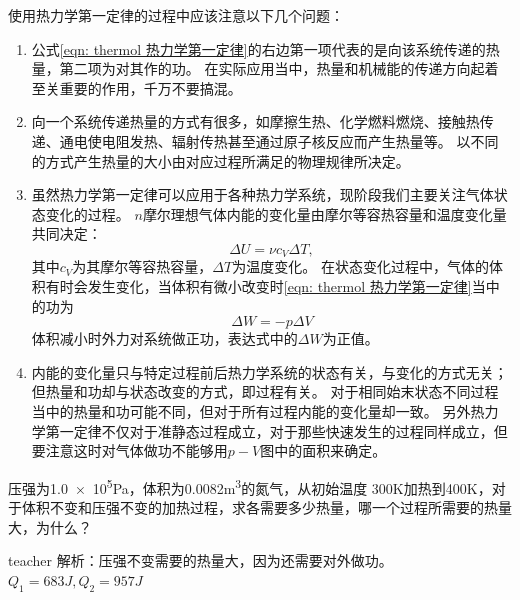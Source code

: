使用热力学第一定律的过程中应该注意以下几个问题：
\begin{enumerate}
\item 公式\ref{eqn: thermol 热力学第一定律}的右边第一项代表的是向该系统传递的热量，第二项为对其作的功。
在实际应用当中，热量和机械能的传递方向起着至关重要的作用，千万不要搞混。
\item 向一个系统传递热量的方式有很多，如摩擦生热、化学燃料燃烧、接触热传递、通电使电阻发热、辐射传热甚至通过原子核反应而产生热量等。
以不同的方式产生热量的大小由对应过程所满足的物理规律所决定。
\item 虽然热力学第一定律可以应用于各种热力学系统，现阶段我们主要关注气体状态变化的过程。
$n$摩尔理想气体内能的变化量由摩尔等容热容量和温度变化量共同决定：
\begin{equation}
\Delta U = \nu c_V\Delta T,
\end{equation}
其中$c_V$为其摩尔等容热容量，$\Delta T$为温度变化。
在状态变化过程中，气体的体积有时会发生变化，当体积有微小改变时\ref{eqn: thermol 热力学第一定律}当中的功为
\begin{equation}
\Delta W = -p\Delta V
\end{equation}
体积减小时外力对系统做正功，表达式中的$\Delta W$为正值。
\item 内能的变化量只与特定过程前后热力学系统的状态有关，与变化的方式无关；但热量和功却与状态改变的方式，即过程有关。
对于相同始末状态不同过程当中的热量和功可能不同，但对于所有过程内能的变化量却一致。
另外热力学第一定律不仅对于准静态过程成立，对于那些快速发生的过程同样成立，但要注意这时对气体做功不能够用$p-V$图中的面积来确定。
\end{enumerate}




\begin{example}
	压强为\num{1.0e5}\si{Pa}，体积为\num{0.0082}\si{m^3}的氮气，从初始温度 300K加热到400K，对于体积不变和压强不变的加热过程，求各需要多少热量，哪一个过程所需要的热量大，为什么？
	\begin{taggedblock}{teacher}
		\newline
		解析：压强不变需要的热量大，因为还需要对外做功。$Q_1=683J , Q_2=957J$
	\end{taggedblock}
\end{example}


